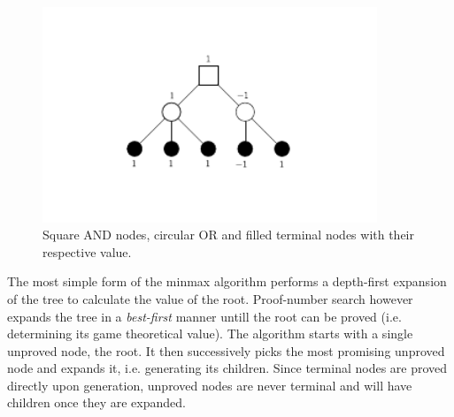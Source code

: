 \documentclass{article}
\begin{document}
\begin{figure}[h]
\center
\includegraphics[width=10cm]{simpleminmax.pdf}
\caption{Square AND nodes, circular OR and filled terminal nodes with their respective value.}
\label{tree:simple}
\end{figure}

The most simple form of the minmax algorithm performs a depth-first expansion of the tree to calculate the value of the root. Proof-number search however
expands the tree in a \textit{best-first} manner untill the root can be proved (i.e. determining its game theoretical value). The algorithm starts with a single
unproved node, the root. It then successively picks the most promising unproved node and expands it, i.e. generating its children. Since terminal nodes are proved
directly upon generation, unproved nodes are never terminal and will have children once they are expanded. 
\end{document}
